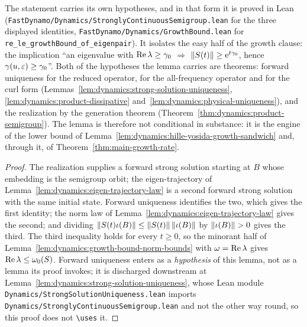 The statement carries its own hypotheses, and in that form it is proved in Lean
(\texttt{FastDynamo/Dynamics/StronglyContinuousSemigroup.lean} for the three displayed
identities, \texttt{FastDynamo/Dynamics/GrowthBound.lean} for
\texttt{re\_le\_growthBound\_of\_eigenpair}).  It isolates the easy half of the growth
clause: the implication ``an eigenvalue with $\operatorname{Re}\lambda\geq\gamma_0 $
$\Rightarrow$ $\left\|S(t)\right\|\geq\mathrm{e}^{t\gamma_0} $, hence $\gamma(u,\varepsilon)\geq\gamma_0 $''.  Both
of the hypotheses the lemma carries are theorems: forward
uniqueness for the reduced operator, for the all-frequency operator and for the curl form
(Lemmas~\ref{lem:dynamics:strong-solution-uniqueness},
\ref{lem:dynamics:product-dissipative} and~\ref{lem:dynamics:physical-uniqueness}), and the realization by the generation theorem
(Theorem~\ref{thm:dynamics:product-semigroup}).
The lemma is therefore not conditional in substance: it is the engine of the lower
bound of Lemma~\ref{lem:dynamics:hille-yosida-growth-sandwich} and, through it, of
Theorem~\ref{thm:main-growth-rate}.

\begin{proof}
  \leanok
  The realization supplies a forward strong solution starting at $B $ whose embedding is
  the semigroup orbit; the eigen-trajectory of
  Lemma~\ref{lem:dynamics:eigen-trajectory-law} is a second forward strong solution with
  the same initial state.  Forward uniqueness identifies the two, which gives the first
  identity; the norm law of Lemma~\ref{lem:dynamics:eigen-trajectory-law} gives the
  second; and dividing $\left\|S(t)\iota(B)\right\|\leq\left\|S(t)\right\|\left\|\iota(B)\right\| $ by
  $\norm{\iota(B)}>0 $ gives the third.  The third inequality holds for every $t\geq0 $, so
  the minorant half of Lemma~\ref{lem:dynamics:growth-bound-norm-bounds} with
  $\omega=\operatorname{Re}\lambda $ gives $\operatorname{Re}\lambda\leq\omega_0(S) $.  Forward uniqueness enters as a
  \emph{hypothesis} of this lemma, not as a lemma its proof invokes; it is discharged
  downstream at Lemma~\ref{lem:dynamics:strong-solution-uniqueness}, whose Lean module
  \texttt{Dynamics/StrongSolutionUniqueness.lean} imports
  \texttt{Dynamics/StronglyContinuousSemigroup.lean} and not the other way round, so this
  proof does not \texttt{\textbackslash uses} it.
\end{proof}

